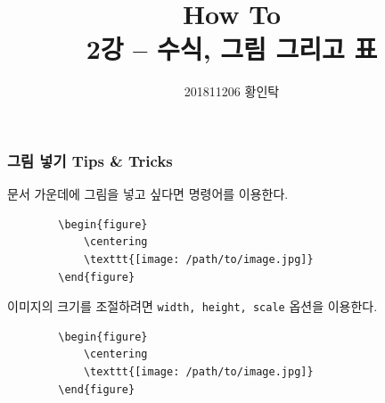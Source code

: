\documentclass[aspectratio={169}]{beamer}
\title{How To \latex{} \\ \normalsize \textnormal{2강 -- 수식, 그림 그리고 표}}
\author{201811206 황인탁}
\begin{document}
\maketitle


\begin{frame}[fragile]
    \frametitle{그림 넣기 Tips \& Tricks}

    문서 가운데에 그림을 넣고 싶다면 \texttt{\centering} 명령어를 이용한다.
    \begin{verbatim}
        \begin{figure}
            \centering
            \texttt{[image: /path/to/image.jpg]}
        \end{figure}
    \end{verbatim}

    이미지의 크기를 조절하려면 \texttt{width, height, scale} 옵션을 이용한다.
    \begin{verbatim}
        \begin{figure}
            \centering
            \texttt{[image: /path/to/image.jpg]}
        \end{figure}
    \end{verbatim}

\end{frame}
\end{document}
